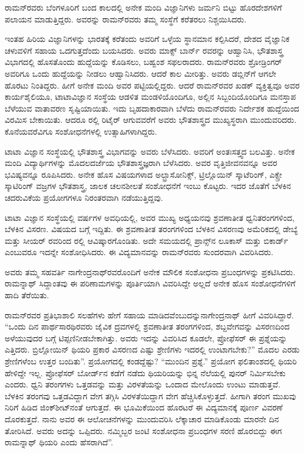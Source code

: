 ರಾಮನ್‍ರವರು ಬೆಂಗಳೂರಿಗೆ ಬಂದ ಕಾಲದಲ್ಲಿ ಅನೇಕ ಮಂದಿ ವಿಜ್ಞಾನಿಗಳು ಜರ್ಮನಿ ಬಿಟ್ಟು ಹೊರದೇಶಗಳಿಗೆ ಪಲಾಯನ ಮಾಡುತ್ತಿದ್ದರು. ಅವರನ್ನು ರಾಮನ್‍ರವರು ತಮ್ಮ ಸಂಸ್ಥೆಗೆ ಕರೆತರಲು ನಿಶ್ಚಯಿಸಿದರು.

ಇಂತಹ ಹಿರಿಯ ವಿಜ್ಞಾನಿಗಳನ್ನು ಭಾರತಕ್ಕೆ ಕರೆತಂದು ಅವರಿಗೆ ಒಳ್ಳೆಯ ಸ್ಥಾನಮಾನ ಕಲ್ಪಿಸಿದರೆ, ದೇಶದ ವೈಜ್ಞಾನಿಕ ಚಳುವಳಿಗೆ ಸಹಾಯ ಒದಗುತ್ತದೆಂದು ಬಯಸಿದರು. ಅವರು ಮಾಕ್ಸ್ ಬಾರ್ನ್ ರವರನ್ನು ಆಹ್ವಾನಿಸಿ, ಭೌತಶಾಸ್ತ್ರ ವಿಭಾಗದಲ್ಲಿ ಹೊಸತೊಂದು ಹುದ್ದೆಯನ್ನು ಕೊಡಿಸಲು, ಬಹ್ವಂಶ ಸಫಲರಾದರು. ರಾಮನ್‍ರವರು ಶ್ರೋಡ್ರಿಂಗರ್ ಅವರಿಗೂ ಒಂದು ಹುದ್ದೆಯನ್ನು ನೀಡಲು ಆಹ್ವಾನಿಸಿದರು. ಆದರೆ ಕಾಲ ಮೀರಿತ್ತು. ಅವರು ಡಬ್ಲಿನ್‍ಗೆ ಆಗಲೇ ಹೊರಟು ನಿಂತಿದ್ದರು. ಹೀಗೆ ಅನೇಕ ಮಂದಿ ಅವರ ಪಟ್ಟಿಯಲ್ಲಿದ್ದರು. ಆದರೆ ರಾಮನ್‍ರವರ ಖಡಕ್ ವ್ಯಕ್ತಿತ್ವವೂ ಅವರ ಕಾರ್ಯಶೈಲಿಯೂ, ಟಾಟಾವಿಜ್ಞಾನ ಸಂಸ್ಥೆಯ ಆಡಳಿತ ಮಂಡಳಿಯೊಂದಿಗೂ, ಅಲ್ಲಿನ ಸಿಬ್ಬಂದಿಯೊಂದಿಗೂ ಮನಸ್ತಾಪ ಬೆಳೆಯುವ ವಾತಾವರಣ ಸೃಷ್ಟಿಯಾಯಿತು. ಇದು ಬೃಹದಾಕಾರವಾಗಿ ಬೆಳೆದು ರಾಮನ್‍ರವರು ನಿರ್ದೇಶಕ ಹುದ್ದೆಯಿಂದ ವಿರಮಿಸ ಬೇಕಾಯಿತು. ಆದರೂ ರಲ್ಲಿ ರಿಟೈರ್ ಆಗುವವರೆಗೆ ಅವರು ಭೌತಶಾಸ್ತ್ರದ ಮುಖ್ಯಸ್ಥರಾಗಿ ಮುಂದುವರಿದರು. ಕೊನೆಯವರೆವಿಗೂ ಸಂಶೋಧನೆಗಳಲ್ಲಿ ಉತ್ಸಾಹಿಗಳಾಗಿದ್ದರು.

ಟಾಟಾ ವಿಜ್ಞಾನ ಸಂಸ್ಥೆಯಲ್ಲಿ ಭೌತಶಾಸ್ತ್ರ ವಿಭಾಗವನ್ನು ಅವರು ಬೆಳೆಸಿದರು. ಅವರಿಗೆ ಅಂತಃಸತ್ತ್ವದ ಬಲವಿತ್ತು. ಅನೇಕ ಮಂದಿ ವಿದ್ಯಾರ್ಥಿಗಳನ್ನು ಮೊದಲದರ್ಜೆಯ ಭೌತಶಾಸ್ತ್ರಜ್ಞರಾಗಿ ಬೆಳೆಸಿದರು. ಅವರ ವೃತ್ತಿಜೀವನವನ್ನೂ ಅವರ ಭವಿಷ್ಯವನ್ನೂ ರೂಪಿಸಿದರು. ಅನೇಕ ಹೊಸ ವಿಷಯಗಳಾದ ಅಲ್ಟ್ರಾಸೋನಿಕ್ಸ್, ಟ್ರಿಲ್ಲೊಯಿನ್ ಸ್ಕಾಟೆರಿಂಗ್, ಎಕ್ಸ್ರೇ ಸ್ಕಾಟಿರಿಂಗ್ ವಜ್ರಗಳ ಭೌತಶಾಸ್ತ್ರ, ಜಾಲಕ ಚಲನಶೀಲತೆ ಸಂಶೋಧನೆಗೆ ಇಂಬು ಕೊಟ್ಟರು. ಇದರ ಜೊತೆಗೆ ಬೆಳಕಿನ ಚದರುವಿಕೆಯ ಪ್ರಯೋಗಗಳೂ ನಿರಂತರವಾಗಿ ನಡೆಯುತ್ತಿದ್ದವು.

ಟಾಟಾ ವಿಜ್ಞಾನ ಸಂಸ್ಥೆಯಲ್ಲಿ  ವರ್ಷಗಳ ಅವಧಿಯಲ್ಲಿ, ಅವರ ಮುಖ್ಯ ಅಧ್ಯಯನವು ಶ್ರವಣಾತೀತ ಧ್ವನಿತರಂಗಗಳಿಂದ, ಬೆಳಕಿನ ವಿಸರಣ. ವಿಷಯದ ಬಗ್ಗೆ ಇದ್ದಿತು. ಈ ಶ್ರವಣಾತೀತ ತರಂಗಗಳಿಂದ ಬೆಳಕಿನ ವಿಸರಣವು ಅಮೆರಿಕದಲ್ಲಿ ಡೇಬ್ಯೆ ಮತ್ತು ಸೀಯರ್ ರವರಿಂದ ರಲ್ಲಿ ಆವಿಷ್ಕಾರಗೊಂಡಿತು. ಅದೇ ಸಮಯದಲ್ಲಿ ಪ್ರಾನ್ಸ್‌ನ ಲೂಕಾಸ್ ಮತ್ತು ಬಿಕಾರ್ಡ್ ಎಂಬುವರೂ ಇದನ್ನೇ ಸಂಶೋಧಿಸಿದರು. ಈ ವಿದ್ಯಮಾನವನ್ನು ರಾಮನ್‍ರವರು ಸುಂದರವಾಗಿ ವಿವರಿಸಿದರು.

ಅವರು ತಮ್ಮ ಸಹವರ್ತಿ ನಾಗೇಂದ್ರನಾಥ್‍ರವರೊಂದಿಗೆ ಅನೇಕ ಮೌಲಿಕ ಸಂಶೋಧನಾ ಪ್ರಬಂಧಗಳನ್ನು ಪ್ರಕಟಿಸಿದರು. ರಾಮನ್ನಾಥ್ ಸಿದ್ದಾಂತವು ಈ ಪರಿಣಾಮಗಳನ್ನು ಪೂರ್ತಿಯಾಗಿ ವಿವರಿಸಿದ್ದೇ ಅಲ್ಲದೆ ಅನೇಕ ಹೊಸ ಸಂಶೋಧನೆಗಳಿಗೆ ಹಾದಿ ತೆರೆಯಿತು.

ರಾಮನ್‍ರವರ ಪ್ರತಿಭಾಶಾಲಿ ಸಲಹೆಗಳು ಹೇಗೆ ಸಹಾಯ ಮಾಡಿದವೆಂಬುದನ್ನು\break ನಾಗೇಂದ್ರನಾಥ್ ಹೀಗೆ ವಿವರಿಸಿದ್ದಾರೆ. “ಒಂದು ದಿನ ಪಾರ್ಥಸಾರಥಿರವರು ಜೈವಿಕ ದ್ರವಗಳಲ್ಲಿ ಶ್ರವಣಾತೀತ ತರಂಗಗಳಿಂದ, ಶಬ್ದವೇಗವನ್ನು ವಿಸರಣದಿಂದ ಅಳೆಯುವುದರ ಬಗ್ಗೆ ಟಿಪ್ಪಣಿ\break ನೀಡಬೇಕಾಗಿತ್ತು. ಅವರು ಇದನ್ನು ವಿವರಿಸಿದ ಕೂಡಲೇ, ಪ್ರೋಫೆಸರ್ ಈ ಪ್ರಶ್ನೆಯನ್ನು ಎತ್ತಿದರು. ಬ್ರಿಲ್ಲೋಯಿನ್ ಥಿಯರಿ ಪ್ರಕಾರ ವಿಸರಣದ ಎಷ್ಟು ಶ್ರೇಣಿಗಳು ಇದರಲ್ಲಿ ಉಂಟಾಗಬೇಕು?” ಮೊದಲ ಎರಡು ಶ್ರೇಣಿಗಳೆಂಬ ಉತ್ತರ ಬಂದಿತು”. ಪ್ರಯೋಗದಲ್ಲಿ ಕಂಡದ್ದೆಷ್ಟು? “ಮುಂದಿನ ಪ್ರಶ್ನೆ.” ಪ್ರಯೋಗ ಫಲಿತಾಂಶದಲ್ಲಿ ಥಿಯರಿ ಹೇಳಿದ್ದೇ ಇಲ್ಲ. ಪ್ರೋಫೆಸರ್ ಬೋರ್ಡ್‌ನ ಕಡೆಗೆ ನಡೆದು ಥಿಯರಿಯನ್ನು ಭಿನ್ನ ನೆಲೆಯಲ್ಲಿ ಪುನರ್ ನಿರ್ಮಿಸಬೇಕು ಎಂದರು. ಧ್ವನಿ ತರಂಗಗಳು ಒತ್ತಡವನ್ನು ಮತ್ತು ವಿರಳತೆಯನ್ನು ಒಂದಾದ ಮೇಲೊಂದು ಉಂಟು ಮಾಡುತ್ತವೆ. ಬೆಳಕಿನ ತರಂಗವು ಒತ್ತಡವಿದ್ದಾಗ ವೇಗ ತಗ್ಗಿಸಿ ವಿರಳತೆಯಿದ್ದಾಗ ವೇಗ ಹೆಚ್ಚಿಸಿಕೊಳ್ಳುತ್ತದೆ. ಹೀಗಾಗಿ ತರಂಗ ಮುಖವು ನಿರಿಗೆ ಹಿಡಿದ ಜಿಂಕ್‍ಶೀಟ್‍ನಂತೆ ಆಗುತ್ತದೆ. ಈ ಭೂಮಿಕೆಯಿಂದ ಹೊರಟರೆ ಈ ವಿದ್ಯಮಾನಕ್ಕೆ ಪೂರ್ಣ ವಿವರಣೆ ದೊರಕುತ್ತದೆ. ನಾನು ಅವರ ಈ ಆಲೋಚನೆಗಳನ್ನು ಮುಂದುವರಿಸಿ ಲೆಕ್ಕಾಚಾರ ಮಾಡಿಕೊಂಡು ಮಾರನೇ ದಿನ ತೋರಿಸಿದೆ. ಅವರು ಅದನ್ನು ಒಪ್ಪಿದರು. ನಮ್ಮಿಬ್ಬರ ಜಂಟಿ ಸಂಶೋಧನಾ ಪ್ರಬಂಧಗಳ ಸರಣಿ ಹೊರಬಿದ್ದು ಈಗ ರಾಮನ್ನಾಥ್ ಥಿಯರಿ ಎಂದು ಹೆಸರಾಗಿದೆ”.

